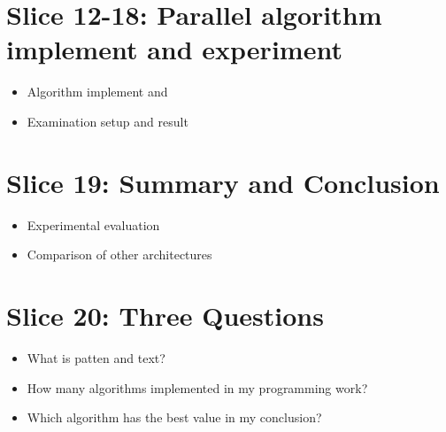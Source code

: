 \documentclass[11pt]{article}       %
\newenvironment{slide}[1]        {\section{#1} \begin{itemize}}%
                                 {\end{itemize}}
\begin{document}
\begin{slide}{Slice 12-18: Parallel algorithm implement and experiment }
\item Algorithm implement and
\item Examination setup and result
\end{slide}


\begin{slide}{Slice 19: Summary and Conclusion }
\item Experimental evaluation
\item Comparison of other architectures
\end{slide}

\begin{slide}{Slice 20: Three Questions }
\item What is patten and text?
\item How many algorithms implemented in my programming work?
\item Which algorithm has the best value in my conclusion?
\end{slide}




\end{document}
